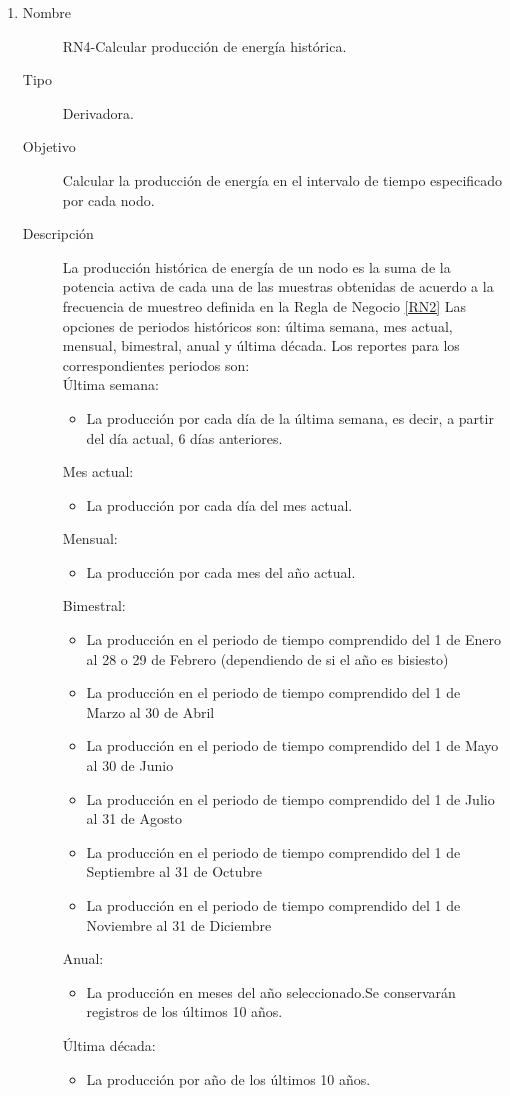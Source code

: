 \begin{enumerate}[label=RN\arabic*.]
\item \label{RN4}
		\begin{description}
			\item[Nombre] RN4-Calcular producción de energía histórica.
			\item[Tipo] Derivadora.
			\item[Objetivo] Calcular la producción de energía en el intervalo de tiempo especificado por cada nodo.
			\item[Descripción] La producción histórica de energía de un nodo es la suma de la potencia activa de cada una de las muestras obtenidas de acuerdo a la frecuencia de muestreo definida en la Regla de Negocio \ref{RN2}  
			Las opciones de periodos históricos son: última semana, mes actual, mensual, bimestral, anual y última década. Los reportes para los correspondientes periodos son:
			\\ Última semana: 
			\begin{itemize}
				\item La producción por cada día de la última semana, es decir, a partir del día actual, 6 días anteriores.
			\end{itemize}
			Mes actual: 
			\begin{itemize}
				\item La producción por cada día del mes actual.
			\end{itemize}
			Mensual: 
			\begin{itemize}
				\item La producción por cada mes del año actual.
			\end{itemize}
			Bimestral: 
			\begin{itemize}
				\item La producción en el periodo de tiempo comprendido del 1 de Enero al 28 o 29 de Febrero (dependiendo de si el año es bisiesto)
				\item La producción en el periodo de tiempo comprendido del 1 de Marzo al 30 de Abril
				\item La producción en el periodo de tiempo comprendido del 1 de Mayo al 30 de Junio
				\item La producción en el periodo de tiempo comprendido del 1 de Julio al 31 de Agosto
				\item La producción en el periodo de tiempo comprendido del 1 de Septiembre al 31 de Octubre
				\item La producción en el periodo de tiempo comprendido del 1 de Noviembre al 31 de Diciembre
			\end{itemize}
			Anual: 
			\begin{itemize}
				\item La producción en meses del año seleccionado.Se conservarán registros de los últimos 10 años.
			\end{itemize}
			Última década:
			\begin{itemize}
			\item La producción por año de los últimos 10 años.
			\end{itemize}
		\end{description}


\end{enumerate}

